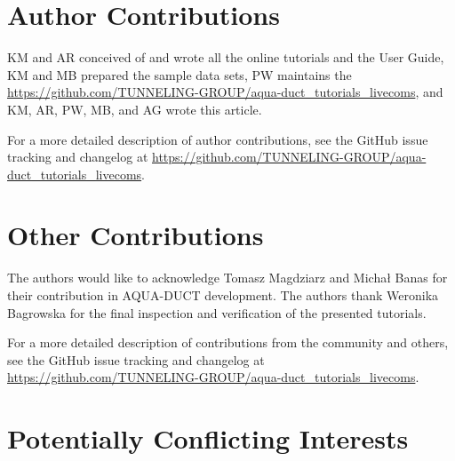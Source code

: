 \documentclass[9pt,tutorial]{livecoms}
\newcommand{\githubrepository}{\url{https://github.com/TUNNELING-GROUP/aqua-duct_tutorials_livecoms}}  %
\begin{document}
\section{Author Contributions}
%

KM and AR conceived of and wrote all the online tutorials and the User Guide, KM and MB prepared the sample data sets, PW maintains the \githubrepository, and KM, AR, PW, MB, and AG wrote this article.

For a more detailed description of author contributions,
see the GitHub issue tracking and changelog at \githubrepository.

\section{Other Contributions}
%

The authors would like to acknowledge Tomasz Magdziarz and Michał Banas for their contribution in AQUA-DUCT development. The authors thank Weronika Bagrowska for the final inspection and verification of the presented tutorials.

For a more detailed description of contributions from the community and others, see the GitHub issue tracking and changelog at \githubrepository.

\section{Potentially Conflicting Interests}
\end{document}
